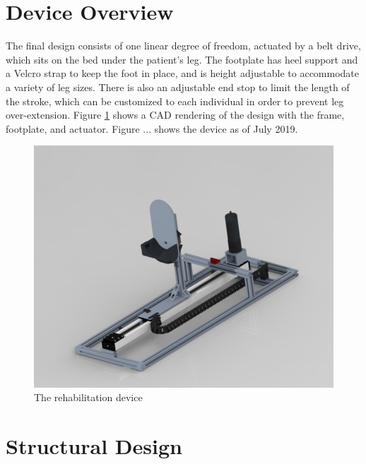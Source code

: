 \documentclass[12pt]{report}
\begin{document}
		
		
	
	

	\section{Device Overview}
	
	The final design consists of one linear degree of freedom, actuated by a belt drive, which sits on the bed under the patient's leg. The footplate has heel support and a Velcro strap to keep the foot in place, and is height adjustable to accommodate a variety of leg sizes. There is also an adjustable end stop to limit the length of the stroke, which can be customized to each individual in order to prevent leg over-extension. Figure \ref{fig:cad} shows a CAD rendering of the design with the frame, footplate, and actuator. Figure ... shows the device as of July 2019.

	\begin{figure}[h] 
		\centering
		\includegraphics[width=0.75\linewidth]{overall_device}
		\caption{The rehabilitation device}
		\label{fig:cad}
	\end{figure}
	
	
	\section{Structural Design}
	
\end{document}
